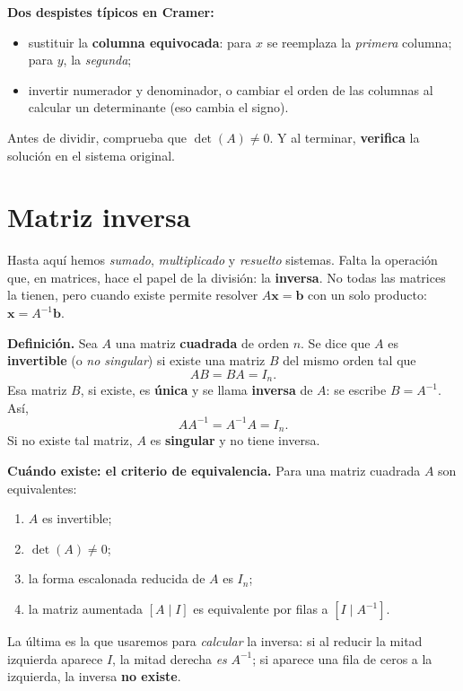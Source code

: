 \documentclass[12pt, letterpaper]{article}
\begin{document}
\begin{cuadroadvertencia}
  \small
  \textbf{Dos despistes típicos en Cramer:}
  \begin{itemize}[leftmargin=1.2em, nosep]
    \item sustituir la \textbf{columna equivocada}: para $x$ se reemplaza la
          \emph{primera} columna; para $y$, la \emph{segunda};
    \item invertir numerador y denominador, o cambiar el orden de las
          columnas al calcular un determinante (eso cambia el signo).
  \end{itemize}
  Antes de dividir, comprueba que $\det(A)\neq0$. Y al terminar,
  \textbf{verifica} la solución en el sistema original.
\end{cuadroadvertencia}


\section{Matriz inversa}

Hasta aquí hemos \emph{sumado}, \emph{multiplicado} y \emph{resuelto} sistemas.
Falta la operación que, en matrices, hace el papel de la división: la
\textbf{inversa}. No todas las matrices la tienen, pero cuando existe permite
resolver $A\mathbf{x}=\mathbf{b}$ con un solo producto:
$\mathbf{x}=A^{-1}\mathbf{b}$.

\begin{cuadroteoria}
  \small
  \textbf{Definición.} Sea $A$ una matriz \textbf{cuadrada} de orden $n$. Se
  dice que $A$ es \textbf{invertible} (o \emph{no singular}) si existe una
  matriz $B$ del mismo orden tal que
  \[
    AB=BA=I_n .
  \]
  Esa matriz $B$, si existe, es \textbf{única} y se llama \textbf{inversa} de
  $A$: se escribe $B=A^{-1}$. Así,
  \[
    AA^{-1}=A^{-1}A=I_n .
  \]
  Si no existe tal matriz, $A$ es \textbf{singular} y no tiene inversa.
\end{cuadroteoria}

\begin{cuadroteoria}
  \small
  \textbf{Cuándo existe: el criterio de equivalencia.} Para una matriz
  cuadrada $A$ son equivalentes:
  \begin{enumerate}[leftmargin=1.4em, nosep]
    \item $A$ es invertible;
    \item $\det(A)\neq0$;
    \item la forma escalonada reducida de $A$ es $I_n$;
    \item la matriz aumentada $[A\mid I]$ es equivalente por filas a
          $[I\mid A^{-1}]$.
  \end{enumerate}
  La última es la que usaremos para \emph{calcular} la inversa: si al reducir
  la mitad izquierda aparece $I$, la mitad derecha \emph{es} $A^{-1}$; si
  aparece una fila de ceros a la izquierda, la inversa \textbf{no existe}.
\end{cuadroteoria}
\end{document}
